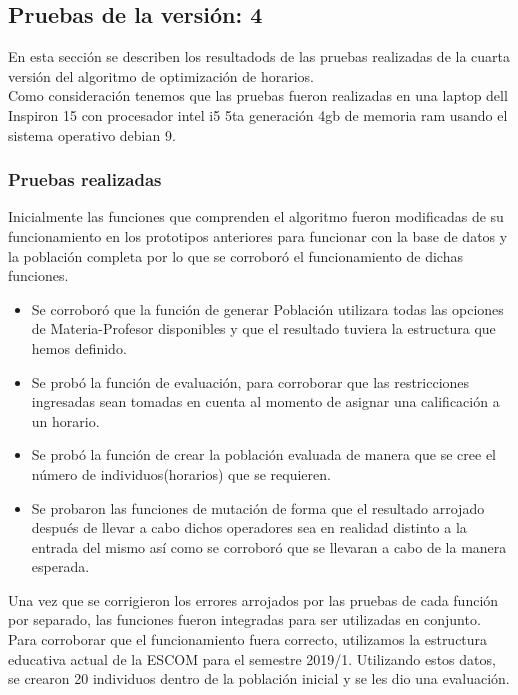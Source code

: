\subsection{Pruebas de la versión: 4} \label{chp:pruebasV1}
En esta sección se describen los resultadods de las pruebas realizadas de la cuarta versión del algoritmo de optimización de horarios.\\

Como consideración tenemos que las pruebas fueron realizadas en una laptop dell Inspiron 15 con procesador intel i5 5ta generación 4gb de memoria ram usando el sistema operativo debian 9.\\


\subsubsection{Pruebas realizadas}

Inicialmente las funciones que comprenden el algoritmo fueron modificadas de su funcionamiento en los prototipos anteriores para funcionar con la base de datos y la población completa por lo que se corroboró el funcionamiento de dichas funciones. \\

\begin{itemize}
	\item Se corroboró que la función de generar Población utilizara todas las opciones de Materia-Profesor disponibles y que el resultado tuviera la estructura que hemos definido. 
	
	\item Se probó la función de evaluación, para corroborar que las restricciones ingresadas sean tomadas en cuenta al momento de asignar una calificación a un horario.
	
	\item Se probó la función de crear la población evaluada de manera que se cree el número de individuos(horarios) que se requieren.
	
	\item Se probaron las funciones de mutación de forma que el resultado arrojado después de llevar a cabo dichos operadores sea en realidad distinto a la entrada del mismo así como se corroboró que se llevaran a cabo de la manera esperada.
	
\end{itemize}

Una vez que se corrigieron los errores arrojados por las pruebas de cada función por separado, las funciones fueron integradas para ser utilizadas en conjunto. Para corroborar que el funcionamiento fuera correcto, utilizamos la estructura educativa actual de la ESCOM para el semestre 2019/1. Utilizando estos datos, se crearon 20 individuos dentro de la población inicial y se les dio una evaluación.\\


